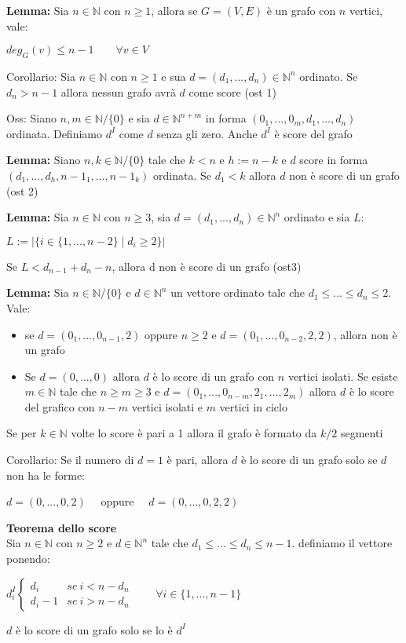 \documentclass[12pt, a4paper]{article}
\begin{document}
\textbf{Lemma:} Sia $n\in\mathbb{N}$ con $n\geq 1$, allora se $G=(V,E)$ è un grafo con $n$ vertici, vale:
\begin{center}
    $deg_{G}(v)\leq n-1\qquad\forall v\in V$
\end{center}

Corollario: Sia $n\in\mathbb{N}$ con $n\geq 1$ e sua $d=(d_{1},...,d_{n})\in\mathbb{N}^{n}$ ordinato. Se 
$d_{n}>n-1$ allora nessun grafo avrà $d$ come score (ost 1)

Oss: Siano $n,m\in\mathbb{N}/\{0\}$ e  sia $d\in\mathbb{N}^{n+m}$ in forma $(0_{1},...,0_{m},d_{1},...,d_{n})$ 
ordinata. Definiamo $d^{I}$ come $d$ senza gli zero. Anche $d^{I}$ è score del grafo

\textbf{Lemma:} Siano $n,k\in\mathbb{N}/\{0\}$ tale che $k<n$ e $h:=n-k$ e $d$ score in forma $(d_{1},...,d_{h},
n-1_{1},...,n-1_{k})$ ordinata. Se $d_{1}<k$ allora $d$ non è score di un grafo (ost 2)

\textbf{Lemma:} Sia $n\in\mathbb{N}$ con $n\geq 3$, sia $d=(d_{1},...,
d_{n})\in\mathbb{N}^{n}$ ordinato e sia $L$:
\begin{center}
    $L:=|\{i\in\{1,..., n-2\}\mid d_{i}\geq 2\}|$
\end{center}
Se $L<d_{n-1}+d_{n}-n$, allora d non è score di un grafo (ost3)

\textbf{Lemma:} Sia $n\in\mathbb{N}/\{0\}$ e $d\in\mathbb{N}^{n}$ un vettore ordinato tale che $d_{1}\leq ...\leq
d_{n}\leq 2$. Vale:
\begin{itemize}
    \item se $d=(0_{1},...,0_{n-1},2)$ oppure $n\geq 2$ e $d=(0_{1},...,0_{n-2},2,2)$, allora non è un grafo
    \item Se $d=(0,...,0)$ allora $d$ è lo score di un grafo con $n$ vertici isolati. Se esiste $m\in\mathbb{N}$
    tale che $n\geq m\geq 3$ e $d=(0_{1},...,0_{n-m},2_{1},...,2_{m})$ allora $d$ è lo score del grafico con $n-m$
    vertici isolati e $m$ vertici in ciclo
\end{itemize}
Se per $k\in\mathbb{N}$ volte lo score è pari a 1 allora il grafo è formato da $k/2$ segmenti

Corollario: Se il numero di $d=1$ è pari, allora $d$ è lo score di un grafo solo se $d$ non ha le forme:
\begin{center}
    $d=(0,...,0,2)\quad$ oppure $\quad d=(0,...,0,2,2)$
\end{center}

\textbf{Teorema dello score}\\
Sia $n\in\mathbb{N}$ con $n\geq 2$ e $d\in\mathbb{N}^{n}$ tale che $d_{1}\leq ...\leq d_{n}\leq n-1$. definiamo il 
vettore ponendo:
\begin{center}
    $d_{i}^{I}
    \begin{cases}
        d_{i} & se\ i<n-d_{n}\\
        d_{i}-1 & se\ i>n-d_{n}
    \end{cases}
    \qquad\forall i\in\{1,...,n-1\}$
\end{center}
$d$ è lo score di un grafo solo se lo è $d^{I}$
\end{document}
